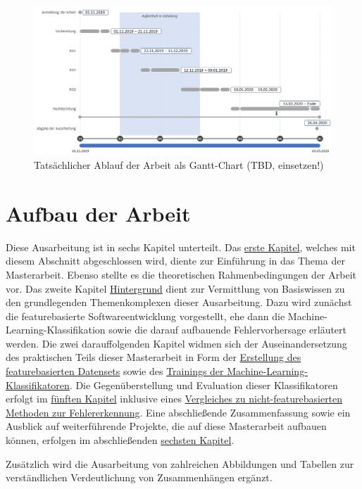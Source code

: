 \begin{figure}[H]
    \centering
    \includegraphics[width=\textwidth]{images/Zeit}
    \caption{Tatsächlicher Ablauf der Arbeit als Gantt-Chart (TBD, einsetzen!)}\label{fig:time-real}
\end{figure}

\section{Aufbau der Arbeit}

Diese Ausarbeitung ist in sechs Kapitel unterteilt. Das \hyperref[introduction]{erste Kapitel}, welches mit diesem Abschnitt abgeschlossen wird, diente zur Einführung in das Thema der Masterarbeit. Ebenso stellte es die theoretischen Rahmenbedingungen der Arbeit vor. Das zweite Kapitel \glqq \hyperref[background]{Hintergrund}\grqq{} dient zur Vermittlung von Basiswissen zu den grundlegenden Themenkomplexen dieser Ausarbeitung. Dazu wird zunächst die featurebasierte Softwareentwicklung vorgestellt, ehe dann die Machine-Learning-Klassifikation sowie die darauf aufbauende Fehlervorhersage erläutert werden. Die zwei darauffolgenden Kapitel widmen sich der Auseinandersetzung des praktischen Teils dieser Masterarbeit in Form der \hyperref[dataset]{Erstellung des featurebasierten Datensets} sowie des \hyperref[training]{Trainings der Machine-Learning-Klassifikatoren}. Die Gegenüberstellung und Evaluation dieser Klassifikatoren erfolgt im \hyperref[evaluation]{fünften Kapitel} inklusive eines \hyperref[classic-eval]{Vergleiches zu nicht-featurebasierten Methoden zur Fehlererkennung}. Eine abschließende Zusammenfassung sowie ein Ausblick auf weiterführende Projekte, die auf diese Masterarbeit aufbauen können, erfolgen im abschließenden \hyperref[conclusion]{sechsten Kapitel}.

Zusätzlich wird die Ausarbeitung von zahlreichen Abbildungen und Tabellen zur verständlichen Verdeutlichung von Zusammenhängen ergänzt.

\cleardoublepage
